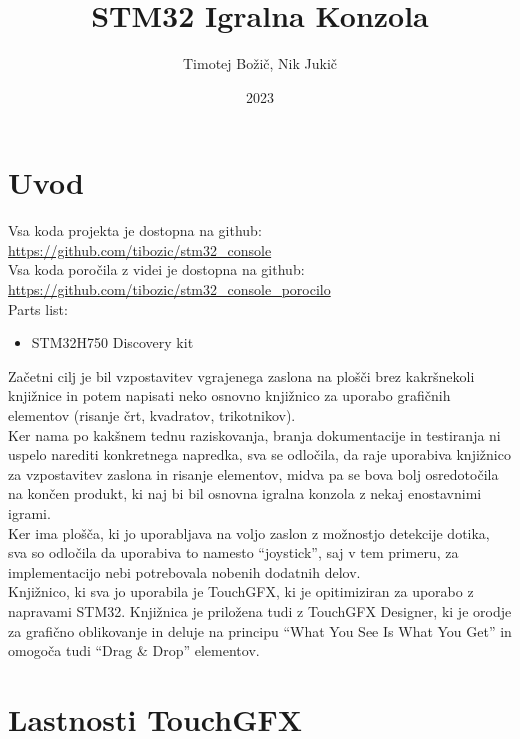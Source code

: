 \documentclass{article}
\author{Timotej Bo\v{z}i\v{c}, Nik Juki\v{c}}
\title{STM32 Igralna Konzola}
\date{2023}
\begin{document}
\maketitle

\tableofcontents

\clearpage

\section{Uvod}
\noindent
Vsa koda projekta je dostopna na github: \href{https://github.com/tibozic/stm32_console}{https://github.com/tibozic/stm32\_console} \\
Vsa koda poro\v{c}ila z videi je dostopna na github: \href{https://github.com/tibozic/stm32_console_porocilo}{https://github.com/tibozic/stm32\_console\_porocilo} \\

\noindent
Parts list:
\begin{itemize}
  \item STM32H750 Discovery kit
\end{itemize}

\noindent
Za\v{c}etni cilj je bil vzpostavitev vgrajenega zaslona na
plo\v{s}\v{c}i brez kakr\v{s}nekoli knji\v{z}nice in potem napisati
neko osnovno knji\v{z}nico za uporabo grafi\v{c}nih elementov
(risanje \v{c}rt, kvadratov, trikotnikov). \\
Ker nama po kak\v{s}nem tednu raziskovanja, branja dokumentacije in testiranja
ni uspelo narediti konkretnega napredka, sva se
odlo\v{c}ila, da raje uporabiva knji\v{z}nico za vzpostavitev
zaslona in risanje elementov, midva pa se bova bolj osredoto\v{c}ila
na kon\v{c}en produkt, ki naj bi bil osnovna igralna konzola z nekaj
enostavnimi igrami. \\
Ker ima plo\v{s}\v{c}a, ki jo uporabljava na voljo zaslon z mo\v{z}nostjo
detekcije dotika, sva so odlo\v{c}ila da uporabiva to namesto ``joystick'',
saj v tem primeru, za implementacijo nebi potrebovala nobenih dodatnih
delov. \\

\noindent
Knji\v{z}nico, ki sva jo uporabila je TouchGFX, ki je opitimiziran za
uporabo z napravami STM32. Knji\v{z}nica je prilo\v{z}ena tudi z
TouchGFX Designer, ki je orodje za grafi\v{c}no oblikovanje in deluje
na principu ``What You See Is What You Get'' in omogo\v{c}a tudi
``Drag \& Drop'' elementov. \\

\section{Lastnosti TouchGFX}
\end{document}
